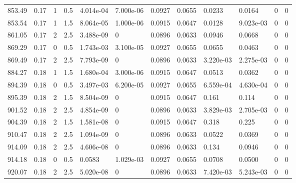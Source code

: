 \documentclass[preview]{standalone}
\begin{document}
{{{{{\begin{tabular}{L{1.2cm}C{1.2cm} C{0.3cm}C{0.5cm} C{1.4cm}C{1.4cm} C{1.4cm}C{1.4cm} C{1.6cm}C{1.6cm} C{1.6cm}C{1.6cm}}
  853.49  &  0.17  & 1     & 0.5 &  4.014e-04  & 7.000e-06  &  0.0927&   0.0655& 0.0233 & 0.0164   &  0 & 0  \\ 
  853.54  &  0.17  & 1     & 1.5 &  8.064e-05  & 1.000e-06  &  0.0915&   0.0647& 0.0128 & 9.023e-03   &  0 & 0  \\ 
  861.05  &  0.17  & 2     & 2.5 &  3.488e-09  & 0  &  0.0896&   0.0633& 0.0946 & 0.0668   &  0 & 0  \\ 
  869.29  &  0.17  & 0     & 0.5 &  1.743e-03  & 3.100e-05  &  0.0927&   0.0655& 0.0655 & 0.0463   &  0 & 0  \\ 
  869.49  &  0.17  & 2     & 2.5 &  7.793e-09  & 0  &  0.0896&   0.0633& 3.220e-03 & 2.275e-03   &  0 & 0  \\ 
  884.27  &  0.18  & 1     & 1.5 &  1.680e-04  & 3.000e-06  &  0.0915&   0.0647& 0.0513 & 0.0362   &  0 & 0  \\ 
  894.39  &  0.18  & 0     & 0.5 &  3.497e-03  & 6.200e-05  &  0.0927&   0.0655& 6.559e-04 & 4.630e-04   &  0 & 0  \\ 
  895.39  &  0.18  & 2     & 1.5 &  8.504e-09  & 0  &  0.0915&   0.0647& 0.161 & 0.114   &  0 & 0  \\ 
  901.52  &  0.18  & 2     & 2.5 &  4.854e-09  & 0  &  0.0896&   0.0633& 3.829e-03 & 2.705e-03   &  0 & 0  \\ 
  904.39  &  0.18  & 2     & 1.5 &  1.581e-08  & 0  &  0.0915&   0.0647& 0.318 & 0.225   &  0 & 0  \\ 
  910.47  &  0.18  & 2     & 2.5 &  1.094e-09  & 0  &  0.0896&   0.0633& 0.0522 & 0.0369   &  0 & 0  \\ 
  914.09  &  0.18  & 2     & 2.5 &  4.606e-08  & 0  &  0.0896&   0.0633& 0.134 & 0.0946   &  0 & 0  \\ 
  914.18  &  0.18  & 0     & 0.5 &  0.0583  & 1.029e-03  &  0.0927&   0.0655& 0.0708 & 0.0500   &  0 & 0  \\ 
  920.07  &  0.18  & 2     & 2.5 &  5.020e-08  & 0  &  0.0896&   0.0633& 7.420e-03 & 5.243e-03   &  0 & 0  \\ 
\hline 
\end{tabular} 

}}}}}
\end{document}
